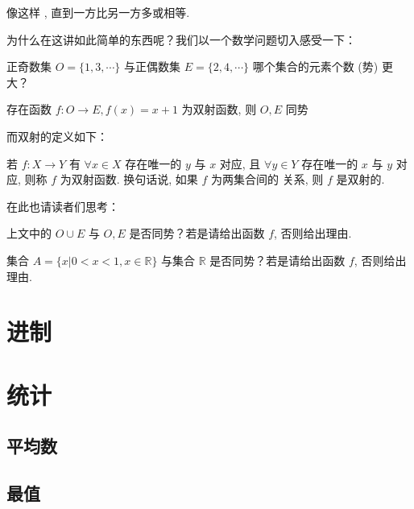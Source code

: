 像这样 , 直到一方比另一方多或相等.

为什么在这讲如此简单的东西呢？我们以一个数学问题切入感受一下：

\begin{question}
  正奇数集 $O = \{1, 3, \cdots\}$ 与正偶数集 $E = \{2, 4, \cdots\}$ 哪个集合的元素个数 (势) 更大？
\end{question}

\begin{solution}
  存在函数 $f: O \to E, f(x) = x + 1$ 为双射函数, 则 $O, E$ 同势
\end{solution}

而双射的定义如下：

\begin{definition}[双射函数]
  若 $f: X \to Y$ 有 $\forall x \in X$ 存在唯一的 $y$ 与 $x$ 对应, 且 $\forall y \in Y$ 存在唯一的 $x$ 与 $y$ 对应, 则称 $f$ 为双射函数. 换句话说, 如果 $f$ 为两集合间的  关系, 则 $f$ 是双射的.
\end{definition}

在此也请读者们思考：

\begin{problem} \label{prob:odd-even-union}
上文中的 $O \cup E$ 与 $O, E$ 是否同势？若是请给出函数 $f$, 否则给出理由.
\end{problem}

\begin{problem} \label{prob:real-number-interval}
集合 $A = \{x | 0 < x < 1, x \in \mathbb{R}\}$ 与集合 $\mathbb{R}$ 是否同势？若是请给出函数 $f$, 否则给出理由.
\end{problem}

\section{进制} \label{sec:base}

\section{统计} \label{sec:statistics}

\subsection{平均数} \label{subsec:mean}

\subsection{最值} \label{subsec:max-min}


